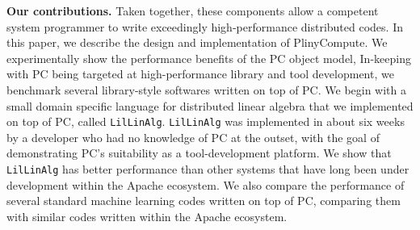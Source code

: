 \vspace{8 pt}
\noindent
\textbf{Our contributions.}
Taken together, these components allow a competent system programmer
to write exceedingly high-performance distributed codes.
In this paper, we describe the design and implementation of PlinyCompute.  We experimentally show the performance benefits of the PC object model, 
In-keeping with PC being targeted at high-performance
library and tool development,
we benchmark several library-style softwares written on top of PC.  We begin with a small domain specific language
for distributed linear algebra that we implemented on top of PC, called \texttt{LilLinAlg}.  \texttt{LilLinAlg} was implemented in about six weeks by a developer
who had no knowledge of PC at the outset, with the goal of demonstrating PC's suitability as a tool-development platform.  
We show that \texttt{LilLinAlg} has better performance than other systems that have long been under development
within the Apache ecosystem.   
We also compare the performance of several standard machine learning codes written on top of PC, comparing them with similar
codes written within the Apache ecosystem.  

